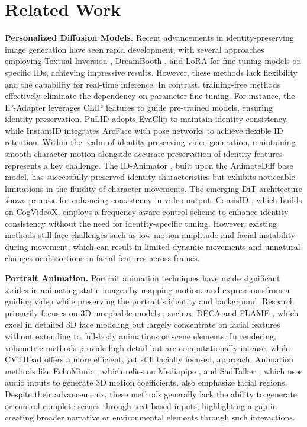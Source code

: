 \section{Related Work}
\textbf{Personalized Diffusion Models.} Recent advancements in identity-preserving image generation have seen rapid development, with several approaches employing Textual Inversion \cite{gal2022image}, DreamBooth \cite{ruiz2023dreambooth}, and LoRA \cite{hu2021lora} for fine-tuning models on specific IDs, achieving impressive results. However, these methods lack flexibility and the capability for real-time inference. In contrast, training-free methods effectively eliminate the dependency on parameter fine-tuning. For instance, the IP-Adapter \cite{radford2021learning} leverages CLIP features \cite{radford2021learning} to guide pre-trained models, ensuring identity preservation. PuLID \cite{guo2024pulid} adopts EvaClip \cite{sun2023eva} to maintain identity consistency, while InstantID \cite{wang2024instantid} integrates ArcFace \cite{deng2019arcface} with pose networks to achieve flexible ID retention. Within the realm of identity-preserving video generation, maintaining smooth character motion alongside accurate preservation of identity features represents a key challenge. The ID-Animator \cite{he2024id}, built upon the AnimateDiff \cite{guo2023animatediff} base model, has successfully preserved identity characteristics but exhibits noticeable limitations in the fluidity of character movements. The emerging DiT architecture \cite{yang2024cogvideox, opensora} shows promise for enhancing consistency in video output. ConsisID \cite{yuan2024identity}, which builds on CogVideoX\cite{yang2024cogvideox}, employs a frequency-aware control scheme to enhance identity consistency without the need for identity-specific tuning. However, existing methods still face challenges such as low motion amplitude and facial instability during movement, which can result in limited dynamic movements and unnatural changes or distortions in facial features across frames.

\noindent \textbf{Portrait Animation.} Portrait animation techniques have made significant strides in animating static images by mapping motions and expressions from a guiding video while preserving the portrait's identity and background. \cite{khakhulin2022realistic, wiles2018x2face, yao2020mesh, pang2023dpe, wang2021one} Research primarily focuses on 3D morphable models \cite{blanz2023morphable}, such as DECA \cite{DECA:Siggraph2021} and FLAME \cite{li2017learning}, which excel in detailed 3D face modeling but largely concentrate on facial features without extending to full-body animations or scene elements. In rendering, volumetric methods provide high detail but are computationally intense, while CVTHead \cite{ma2024cvthead} offers a more efficient, yet still facially focused, approach. Animation methods like EchoMimic \cite{chen2024echomimic}, which relies on Mediapipe \cite{lugaresi2019mediapipe}, and SadTalker \cite{zhang2023sadtalker}, which uses audio inputs to generate 3D motion coefficients, also emphasize facial regions. Despite their advancements, these methods generally lack the ability to generate or control complete scenes through text-based inputs, highlighting a gap in creating broader narrative or environmental elements through such interactions.